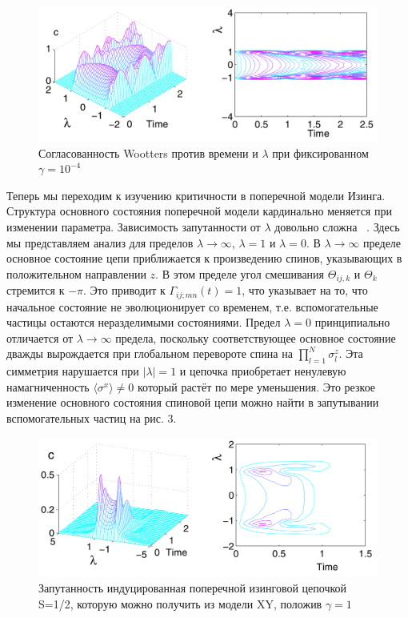 \documentclass[11pt]{article}
\begin{document}
\begin{figure}[htp]
	\centering
	\includegraphics[scale=0.28]{fig2}
	\caption {Согласованность Wootters против времени и $\lambda$ при фиксированном $\gamma=10^{-4}$ ~\cite{yi}}
	\label{}
\end{figure}

Теперь мы переходим к изучению критичности в поперечной модели Изинга. Структура основного состояния поперечной модели кардинально меняется при изменении параметра. Зависимость запутанности от $\lambda$ довольно сложна ~\cite{b2}. Здесь мы представляем анализ для пределов $\lambda → \infty$, $\lambda = 1$ и $\lambda = 0$. В $\lambda → \infty$ пределе основное состояние цепи приближается к произведению спинов, указывающих в положительном направлении $z$. В этом пределе угол смешивания $\Theta_{ij,k}$ и $\Theta_k$ стремится к $-\pi$. Это приводит к $\Gamma_{ij;mn}(t)=1$, что указывает на то, что начальное состояние не эволюционирует со временем, т.е. вспомогательные частицы остаются неразделимыми состояниями. Предел $\lambda = 0$ принципиально отличается от $\lambda → \infty$ предела, поскольку соответствующее основное состояние дважды вырождается при глобальном перевороте спина на $\prod_{l=1}^{N}\sigma_l^z$. Эта симметрия нарушается при $|\lambda |= 1$ и цепочка приобретает ненулевую намагниченность $\langle \sigma^x \rangle \ne 0$ который растёт по мере уменьшения. Это резкое изменение основного состояния спиновой цепи можно найти в запутывании вспомогательных частиц на рис. 3. 

\begin{figure}[htp]
	\centering
	\includegraphics[scale=0.28]{fig3}
	\caption {Запутанность индуцированная поперечной изинговой цепочкой S=1/2, которую можно получить из модели XY, положив $\gamma=1$ ~\cite{yi}}
	\label{}
\end{figure}
\end{document}
